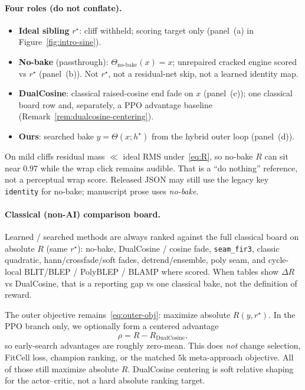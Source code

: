 \paragraph{Four roles (do not conflate).}
\label{sec:four-roles}
\begin{itemize}
  \item \textbf{Ideal sibling} $r^{\star}$: cliff withheld; scoring target only (panel~(a) in Figure~\ref{fig:intro-sine}).
  \item \textbf{No-bake} (passthrough): $\Theta_{\mathrm{no\text{-}bake}}(x)=x$; unrepaired cracked engine scored vs $r^{\star}$ (panel~(b)). Not $r^{\star}$, not a residual-net skip, not a learned identity map.
  \item \textbf{DualCosine}: classical raised-cosine end fade on $x$ (panel~(c)); one classical board row and, separately, a PPO advantage baseline (Remark~\ref{rem:dualcosine-centering}).
  \item \textbf{Ours}: searched bake $y=\Theta(x;h^{\star})$ from the hybrid outer loop (panel~(d)).
\end{itemize}
On mild cliffs residual mass $\ll$ ideal RMS under~\eqref{eq:R}, so no-bake $R$ can sit near $0.97$ while the wrap click remains audible.
That is a ``do nothing'' reference, not a perceptual wrap score.
Released JSON may still use the legacy key \texttt{identity} for no-bake; manuscript prose uses \emph{no-bake}.

\paragraph{Classical (non-AI) comparison board.}
\label{sec:classical-board}
Learned / searched methods are always ranked against the full classical board on absolute $R$ (same $r^{\star}$):
no-bake, DualCosine / cosine fade, \texttt{seam\_fir3}, classic quadratic, hann/crossfade/soft fades, detrend/ensemble, poly seam, and cycle-local BLIT/BLEP / PolyBLEP / BLAMP where scored.
When tables show $\Delta R$ vs DualCosine, that is a reporting gap vs one classical bake, not the definition of reward.

\begin{remark}
\label{rem:dualcosine-centering}
The outer objective remains~\eqref{eq:outer-obj}: maximize absolute $R(y,r^{\star})$.
In the PPO branch only, we optionally form a centered advantage
\begin{equation}
\label{eq:dualcosine-centering}
\rho = R - R_{\mathrm{DualCosine}},
\end{equation}
so early-search advantages are roughly zero-mean.
This does \emph{not} change selection, FitCell loss, champion ranking, or the matched $5$k meta-approach objective.
All of those still maximize absolute $R$.
DualCosine centering is soft relative shaping for the actor--critic, not a hard absolute ranking target.
\end{remark}

